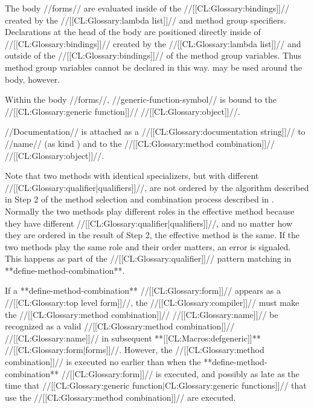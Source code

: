 The body //forms// are evaluated inside of the //[[CL:Glossary:bindings]]// created by the //[[CL:Glossary:lambda list]]// and method group specifiers.  Declarations at the head of the body are positioned directly inside of //[[CL:Glossary:bindings]]// created by the //[[CL:Glossary:lambda list]]// and outside of the //[[CL:Glossary:bindings]]// of the method group variables. Thus method group variables cannot be declared in this way.  may be used around the body, however.

Within the body //forms//, //generic-function-symbol// is bound to the //[[CL:Glossary:generic function]]// //[[CL:Glossary:object]]//.

//Documentation// is attached as a //[[CL:Glossary:documentation string]]// to //name// (as kind ) and to the //[[CL:Glossary:method combination]]// //[[CL:Glossary:object]]//.

Note that two methods with identical specializers, but with different //[[CL:Glossary:qualifier|qualifiers]]//, are not ordered by the algorithm described in Step 2 of the method selection and combination process described in \secref\MethodSelectionAndCombination. Normally the two methods play different roles in the effective method because they have different //[[CL:Glossary:qualifier|qualifiers]]//, and no matter how they are ordered in the result of Step 2, the effective method is the same. If the two methods play the same role and their order matters,  an error is signaled. This happens as part of the //[[CL:Glossary:qualifier]]// pattern matching in **define-method-combination**.

\endlist

If a **define-method-combination** //[[CL:Glossary:form]]// appears as a //[[CL:Glossary:top level form]]//, the //[[CL:Glossary:compiler]]// must make the //[[CL:Glossary:method combination]]// //[[CL:Glossary:name]]// be recognized as a valid //[[CL:Glossary:method combination]]// //[[CL:Glossary:name]]// in subsequent **[[CL:Macros:defgeneric]]** //[[CL:Glossary:form|forms]]//. However, the //[[CL:Glossary:method combination]]// is executed no earlier than when the **define-method-combination** //[[CL:Glossary:form]]// is executed, and possibly as late as the time that //[[CL:Glossary:generic function|CL:Glossary:generic functions]]// that use the //[[CL:Glossary:method combination]]// are executed.

